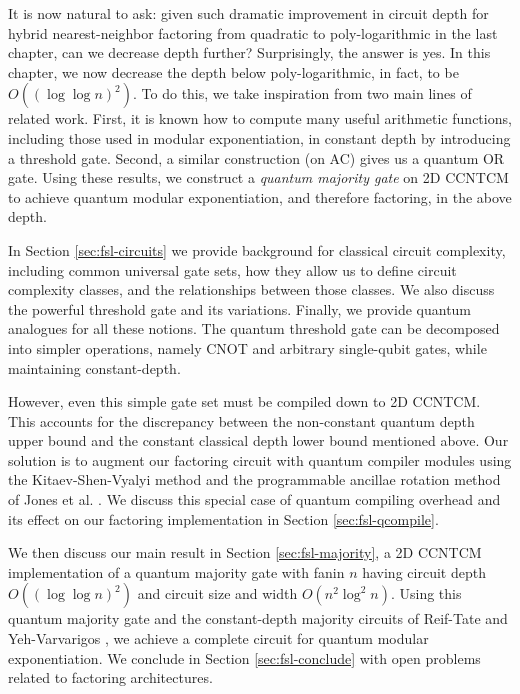 It is now natural to ask: given such dramatic improvement in circuit depth
for hybrid nearest-neighbor factoring
from quadratic \cite{Kutin2006} to poly-logarithmic in the last chapter, can we
decrease depth further? Surprisingly, the answer is yes. In this
chapter, we now decrease the depth below poly-logarithmic, in fact,
to be $O((\log \log n)^2)$. To do this, we take inspiration from
two main lines of related work. First, it is known how to compute
many useful arithmetic functions, including those used in modular
exponentiation, in constant depth by introducing a threshold gate.
Second, a similar construction (on \textsf{AC}) gives us a
quantum OR gate. Using these results,
we construct a \emph{quantum majority gate} on \textsf{2D CCNTCM} to
achieve quantum modular exponentiation, and therefore factoring, in the above
depth.

In Section \ref{sec:fsl-circuits} we provide background for classical circuit complexity,
including common universal gate sets, how they allow us to define circuit
complexity classes, and the relationships between those classes. We also
discuss the powerful threshold gate and its variations. Finally, we provide
quantum analogues for all these notions.
The quantum threshold
gate can be decomposed into simpler operations, namely CNOT and
arbitrary single-qubit gates, while maintaining constant-depth.

However,
even this simple gate set must be compiled down to \textsf{2D CCNTCM}.
This accounts for the discrepancy between the
non-constant quantum depth upper bound and the constant classical
depth lower bound mentioned above. Our solution is to augment our factoring circuit
with quantum compiler modules using the Kitaev-Shen-Vyalyi method \cite{Kitaev2002}
and the programmable ancillae rotation method of Jones et al. \cite{Jones2012}.
We discuss this special case of quantum
compiling overhead and its effect on our factoring implementation in
Section \ref{sec:fsl-qcompile}.

We then discuss our main result in Section \ref{sec:fsl-majority},
a \textsf{2D CCNTCM} implementation
of a quantum majority gate with fanin $n$ having circuit
depth $O((\log \log n)^2)$ and
circuit size and width $O(n^2\log^2 n)$. Using this quantum
majority gate and the constant-depth majority circuits of
Reif-Tate \cite{Reif1992} and Yeh-Varvarigos \cite{Yeh1996},
we achieve a complete circuit for quantum modular exponentiation.
We conclude in Section \ref{sec:fsl-conclude} with open problems
related to factoring architectures.